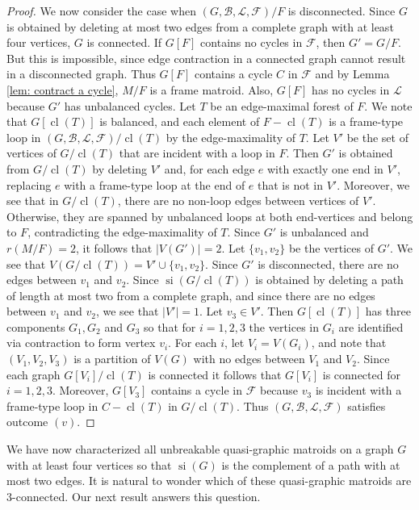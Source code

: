 \documentclass[12pt]{article}
\theoremstyle{definition}
\theoremstyle{plain} %
\newcommand{\cB}{\mathcal{B}}
\newcommand{\cF}{\mathcal{F}}
\newcommand{\cL}{\mathcal{L}}
\DeclareMathOperator{\si}{si}
\DeclareMathOperator{\cl}{cl}
\newcommand{\qbg}{\ensuremath{(G,\cB,\cL,\cF)}}
\begin{document}
\begin{proof}
We now consider the case when $\qbg/F$ is disconnected. Since $G$ is obtained by deleting at most two edges from a complete graph with at least four vertices, $G$ is connected. If $G[F]$ contains no cycles in $\cF$, then $G'=G/F$. But this is impossible, since edge contraction in a connected graph cannot result in a disconnected graph. Thus $G[F]$ contains a cycle $C$ in $\cF$ and by Lemma \ref{lem: contract a cycle}, $M/F$ is a frame matroid. Also, $G[F]$ has no cycles in $\cL$ because $G'$ has unbalanced cycles. Let $T$ be an edge-maximal forest of $F$. We note that $G[\cl(T)]$ is balanced, and each element of $F-\cl(T)$ is a frame-type loop in $\qbg/\cl(T)$ by the edge-maximality of $T$. Let $V'$ be the set of vertices of $G/\cl(T)$ that are incident with a loop in $F$. Then $G'$ is obtained from $G/\cl(T)$ by deleting $V'$ and, for each edge $e$ with exactly one end in $V'$, replacing $e$ with a frame-type loop at the end of $e$ that is not in $V'$. 
Moreover, we see that in $G/\cl(T)$, there are no non-loop edges between vertices of $V'$. Otherwise, they are spanned by unbalanced loops at both end-vertices and belong to $F$, contradicting the edge-maximality of $T$. 
Since $G'$ is unbalanced and $r(M/F)=2$, it follows that $\lvert V(G')\rvert=2$. Let $\{v_1,v_2\}$ be the vertices of $G'$. We see that $V(G/\cl(T))=V'\cup\{v_1,v_2\}$. Since $G'$ is disconnected, there are no edges between $v_1$ and $v_2$. Since $\si(G/\cl(T))$ is obtained by deleting a path of length at most two from a complete graph, and since there are no edges between $v_1$ and $v_2$, we see that $\lvert V'\rvert=1$. Let $v_3\in V'$. Then $G[\cl(T)]$ has three components $G_1,G_2$ and $G_3$ so that for $i=1,2,3$ the vertices in $G_i$ are identified via contraction to form vertex $v_i$. For each $i$, let $V_i=V(G_i)$, and note that $(V_1,V_2,V_3)$ is a partition of $V(G)$ with no edges between $V_1$ and $V_2$. Since each graph $G[V_i]/\cl(T)$ is connected it follows that $G[V_i]$ is connected for $i=1,2,3$. Moreover, $G[V_3]$ contains a cycle in $\cF$ because $v_3$ is incident with a frame-type loop in $C-\cl(T)$ in $G/\cl(T)$.
Thus $\qbg$ satisfies outcome $(v)$.  
\end{proof}



We have now characterized all unbreakable quasi-graphic matroids on a graph $G$ with at least four vertices so that $\si(G)$ is the complement of a path with at most two edges.
It is natural to wonder which of these quasi-graphic matroids are $3$-connected.
Our next result answers this question.
\end{document}
